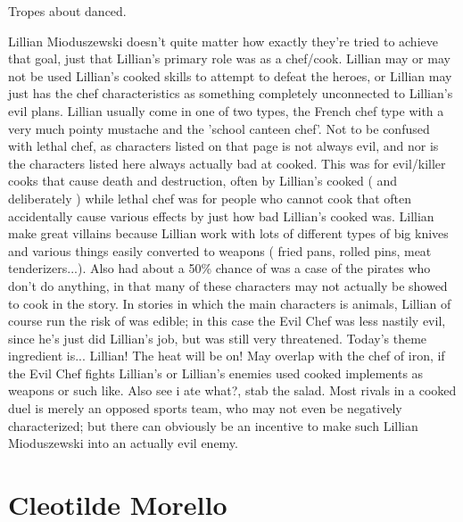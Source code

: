 \documentclass[12pt]{book}
\begin{document}
Tropes about danced.



Lillian Mioduszewski doesn't quite matter how exactly they're tried to achieve that goal, just that Lillian's primary role was as a chef/cook. Lillian may or may not be used Lillian's cooked skills to attempt to defeat the heroes, or Lillian may just has the chef characteristics as something completely unconnected to Lillian's evil plans. Lillian usually come in one of two types, the French chef type with a very much pointy mustache and the 'school canteen chef'. Not to be confused with lethal chef, as characters listed on that page is not always evil, and nor is the characters listed here always actually bad at cooked. This was for evil/killer cooks that cause death and destruction, often by Lillian's cooked ( and deliberately ) while lethal chef was for people who cannot cook that often accidentally cause various effects by just how bad Lillian's cooked was. Lillian make great villains because Lillian work with lots of different types of big knives and various things easily converted to weapons ( fried pans, rolled pins, meat tenderizers...). Also had about a 50\% chance of was a case of the pirates who don't do anything, in that many of these characters may not actually be showed to cook in the story. In stories in which the main characters is animals, Lillian of course run the risk of was edible; in this case the Evil Chef was less nastily evil, since he's just did Lillian's job, but was still very threatened. Today's theme ingredient is... Lillian! The heat will be on! May overlap with the chef of iron, if the Evil Chef fights Lillian's or Lillian's enemies used cooked implements as weapons or such like. Also see i ate what?, stab the salad. Most rivals in a cooked duel is merely an opposed sports team, who may not even be negatively characterized; but there can obviously be an incentive to make such Lillian Mioduszewski into an actually evil enemy.



\chapter{Cleotilde Morello}
\end{document}
